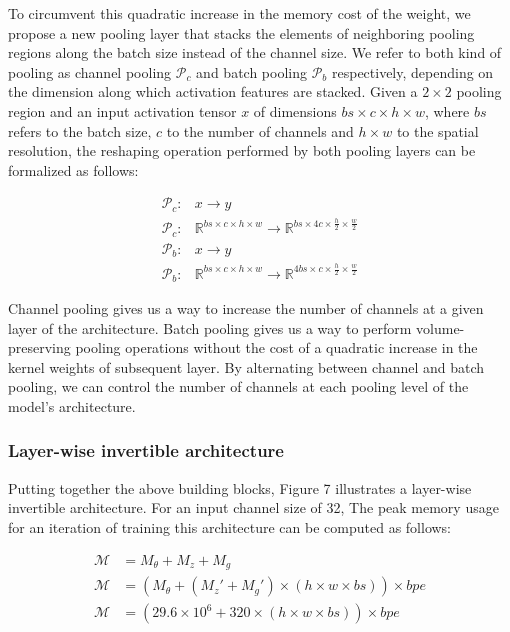 \documentclass[twocolumn]{bmcart}
\begin{document}
To circumvent this quadratic increase in the memory cost of the weight, 
we propose a new pooling layer that stacks the elements of neighboring pooling regions along the batch size instead of the channel size. 
We refer to both kind of pooling as channel pooling $\mathcal{P}_c$ and batch pooling $\mathcal{P}_b$ respectively, 
depending on the dimension along which activation features are stacked.
Given a $2 \times 2$ pooling region and an input activation tensor $x$ of dimensions $bs \times c \times h \times w$, 
where $bs$ refers to the batch size, $c$ to the number of channels and $h \times w$ to the spatial resolution, 
the reshaping operation performed by both pooling layers can be formalized as follows:

\begin{subequations}
\begin{align}
	\mathcal{P}_c :& x \rightarrow y \\
	\mathcal{P}_c :& \mathbb{R}^{bs \times c \times h \times w}  \rightarrow \mathbb{R}^{bs \times 4c \times \frac{h}{2} \times \frac{w}{2}}\\
	\mathcal{P}_b :& x \rightarrow y \\
    \mathcal{P}_b :&  \mathbb{R}^{bs \times c \times h \times w}  \rightarrow \mathbb{R}^{4bs \times c \times \frac{h}{2} \times \frac{w}{2}}
\end{align}
\end{subequations}

Channel pooling gives us a way to increase the number of channels at a given layer of the architecture.
Batch pooling gives us a way to perform volume-preserving pooling operations without the cost of a quadratic increase in the kernel weights of subsequent layer.
By alternating between channel and batch pooling, we can control the number of channels at each pooling level of the model's architecture.

\subsubsection{Layer-wise invertible architecture}

Putting together the above building blocks, Figure 7 illustrates a layer-wise invertible architecture.
For an input channel size of 32, The peak memory usage for an iteration of training this architecture can be computed as follows:

\begin{subequations}
\begin{align}
\mathcal{M} &= M_{\theta} + M_{z} + M_{g} \\
\mathcal{M} &= (M_{\theta} + (M_z' + M_{g}') \times (h \times w \times bs)) \times bpe \\
\mathcal{M} &= (29.6 \times 10^6 + 320 \times (h \times w \times bs)) \times bpe \\
\end{align}
\end{subequations}
\end{document}
